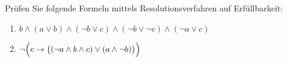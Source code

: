 \begin{exercise}
  \label{logic:resolution-1}
  Prüfen Sie folgende Formeln mittels Resolutionsverfahren auf
  Erfüllbarkeit:
  \begin{enumerate}
  \item $b \wedge (a \vee b) \wedge (\neg b \vee c) \wedge (\neg b \vee
    \neg c) \wedge (\neg a \vee c)$
  \item $\neg \Bigl(c \rightarrow \bigl((\neg a \wedge b \wedge c) \vee (a \wedge
    \neg b)\bigr)\Bigr)$
  \end{enumerate}
\end{exercise}

